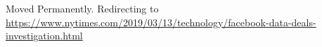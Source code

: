 Moved Permanently. Redirecting to
\href{https://www.nytimes.com/2019/03/13/technology/facebook-data-deals-investigation.html}{https://www.nytimes.com/2019/03/13/technology/facebook-data-deals-investigation.html}
